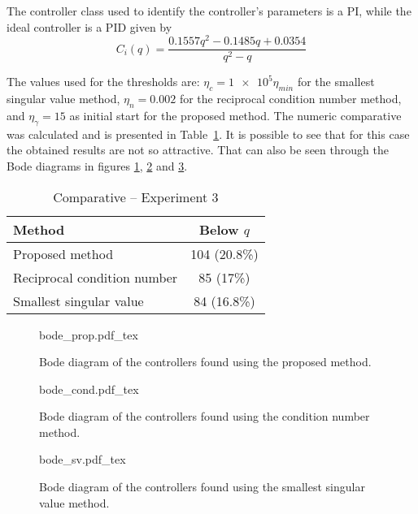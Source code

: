 The controller class used to identify the controller's parameters is a PI, while the ideal controller is a PID given by
\[
	C_i(q) = \frac{0.1557 q^2 - 0.1485 q + 0.0354}{q^2 - q}
\]

The values used for the thresholds are: $\eta_c = \num{1e5}\eta_{min} $ for the smallest singular value method, $\eta_n = 0.002$ for the reciprocal condition number method, and $\eta_\gamma = 15$ as initial start for the proposed method.
The numeric comparative was calculated and is presented in Table~\ref{tab:comp_ol_mismatched}.
It is possible to see that for this case the obtained results are not so attractive.
That can also be seen through the Bode diagrams in figures \ref{fig:bode_prop}, \ref{fig:bode_cond} and \ref{fig:bode_sv}.
\begin{table}[h!]
\caption{Comparative -- Experiment 3 \label{tab:comp_ol_mismatched}}
\centering
\begin{tabular}{lc}
\toprule
Method & Below $q$\\
\midrule
Proposed method & 104 (20.8\%) \\
Reciprocal condition number & 85 (17\%) \\
Smallest singular value & 84 (16.8\%) \\
\bottomrule
\end{tabular}
\end{table}

\begin{figure}[h!]
  \centering
  \def\svgwidth{\columnwidth}
  {\footnotesize{bode_prop.pdf_tex}}
  \caption{\label{fig:bode_prop} Bode diagram of the controllers found using the proposed method.}
\end{figure}

\begin{figure}[h!]
  \centering
  \def\svgwidth{\columnwidth}
  {\footnotesize{bode_cond.pdf_tex}}
  \caption{\label{fig:bode_cond} Bode diagram of the controllers found using the condition number method.}
\end{figure}

\begin{figure}[h!]
  \centering
  \def\svgwidth{\columnwidth}
  {\footnotesize{bode_sv.pdf_tex}}
  \caption{\label{fig:bode_sv} Bode diagram of the controllers found using the smallest singular value method.}
\end{figure}





